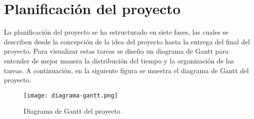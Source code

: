 
\section{Planificación del proyecto}
La planificación del proyecto se ha estructurado en siete fases, las cuales se describen desde la concepción de la idea del proyecto hasta la entrega del final del proyecto. Para visualizar estas tareas se diseño un diagrama de Gantt para entender de mejor manera la distribución del tiempo y la organización de las tareas. A continuación, en la siguiente figura se muestra el diagrama de Gantt del proyecto. 
\begin{figure}[H]
    \centering
    \texttt{[image: diagrama-gantt.png]}  %
    \caption{Diagrama de Gantt del proyecto}
    \label{fig:gantt}
    \end{figure}
